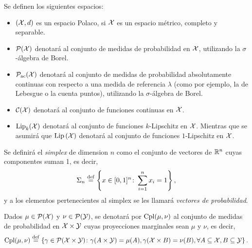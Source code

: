  {
  \begin{definition}
	  Se definen los siguientes espacios:
	  \begin{itemize}
		  \item $(\cX, d)$ es un espacio Polaco, si $\cX$ es un espacio métrico, completo y separable.
		  \item $\ProbSpace[\cX]$ denotará al conjunto de medidas de probabilidad en $\cX$, utilizando la $\sigma$-álgebra de Borel.
		  \item $\ProbSpaceAC[\cX]$ denotará al conjunto de medidas de probabilidad absolutamente continuas con respecto a una medida de referencia $\lambda$ (como por ejemplo, la de Lebesgue o la cuenta puntos), utilizando la $\sigma$-álgebra de Borel.
		  \item $\mathcal{C}(\cX)$ denotará al conjunto de funciones continuas en $\cX$.
		  \item ${\Lip}_{k}(\cX)$ denotará al conjunto de funciones $k$-Lipschitz en $\cX$. Mientras que se asumirá que $\Lip[\cX]$ denotará al conjunto de funciones $1$-Lipschitz en $\cX$. 
	  \end{itemize}
  \end{definition}

  \begin{definition}
	  Se definirá el \emph{simplex} de dimension $n$ como el conjunto de vectores de $\R^{n}$ cuyas componentes suman 1, es decir,
	  \begin{equation}
		  \Simplex \eqdef \left\{
		  x \in [0, 1]^{n} \colon \sum_{i=1}^{n} x_{i} = 1
		  \right\},
	  \end{equation}
	  y a los elementos pertenecientes al simplex se les llamará \emph{vectores de probabilidad}.
  \end{definition}

  \begin{definition}
	  Dados $\mu \in \ProbSpace[\cX]$ y $\nu \in \ProbSpace[\cY]$, se denotará por $\Cpl(\mu, \nu)$ al conjunto de medidas de probabilidad en $\cX \times \cY$ cuyas proyecciones marginales sean $\mu$ y $\nu$, es decir,
	  \begin{equation}
		  \Cpl(\mu, \nu) \eqdef \left\{
		  \gamma \in \ProbSpace[\cX \times \cY] \colon \gamma(A \times \cY) = \mu(A), \gamma(\cX \times B) = \nu(B), \forall A \subseteq \cX, B \subseteq \cY
		  \right\}.
	  \end{equation}
  \end{definition}

}
